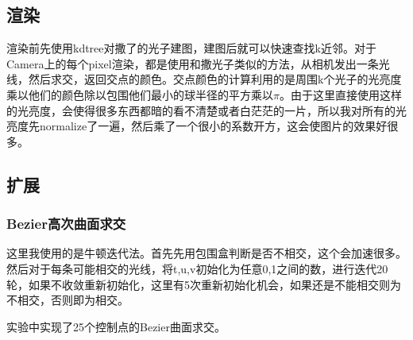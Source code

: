\documentclass[10pt, a4paper]{article}
\begin{document}
      \subsection{渲染}
        渲染前先使用kdtree对撒了的光子建图，建图后就可以快速查找k近邻。对于Camera上的每个pixel渲染，都是使用和撒光子类似的方法，从相机发出一条光线，然后求交，返回交点的颜色。交点颜色的计算利用的是周围k个光子的光亮度乘以他们的颜色除以包围他们最小的球半径的平方乘以$\pi$。由于这里直接使用这样的光亮度，会使得很多东西都暗的看不清楚或者白茫茫的一片，所以我对所有的光亮度先normalize了一遍，然后乘了一个很小的系数开方，这会使图片的效果好很多。
      \subsection{扩展}
        \subsubsection{Bezier高次曲面求交}
          这里我使用的是牛顿迭代法。首先先用包围盒判断是否不相交，这个会加速很多。然后对于每条可能相交的光线，将t,u,v初始化为任意0,1之间的数，进行迭代20轮，如果不收敛重新初始化，这里有5次重新初始化机会，如果还是不能相交则为不相交，否则即为相交。

          实验中实现了25个控制点的Bezier曲面求交。
\end{document}
